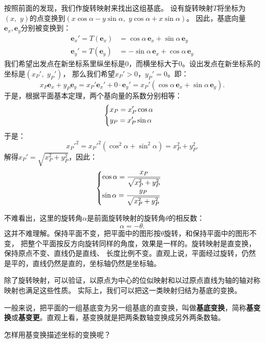 \documentclass[12pt,UTF8,fontset=none]{ctexbook}
\begin{document}
按照前面的发现，我们作旋转映射来找出这组基底。
设有旋转映射$T$将坐标为$(x,\,\, y)$的点变换到$(x\cos{\alpha} - y\sin{\alpha},\,\,y\cos{\alpha} + x\sin{\alpha})$。
因此，基底向量$\mathbf{e}_x, \mathbf{e}_y$分别被变换到：
\begin{align*}
    \mathbf{e}_x' = T(\mathbf{e}_x) &= \cos{\alpha}\,\mathbf{e}_x + \sin{\alpha}\,\mathbf{e}_y  \\
    \mathbf{e}_y' = T(\mathbf{e}_y) &= -\sin{\alpha}\,\mathbf{e}_x + \cos{\alpha}\,\mathbf{e}_y  
\end{align*}
我们希望出发点在新坐标系里纵坐标是$0$，而横坐标大于$0$。设出发点在新坐标系的坐标是$(x_P', \,\, y_P')$，
那么我们希望$x_P' > 0$，$y_P' = 0$。即：
$$ x_P\mathbf{e}_x + y_P\mathbf{e}_y = x_P' \mathbf{e}_x' + 0 \cdot \mathbf{e}_y' = x_P' (\cos{\alpha}\,\mathbf{e}_x + \sin{\alpha}\,\mathbf{e}_y). $$
于是，根据平面基本定理，两个基向量的系数分别相等：
\begin{alignat*}{1}
&   \begin{dcases}
        x_P = x_P' \cos{\alpha} \\
        y_P = x_P' \sin{\alpha} 
    \end{dcases}
\end{alignat*}
于是：
$$ x_P'^2 = x_P'^2 (\cos^2{\alpha} + \sin^2{\alpha}) = x_P^2 + y_P^2. $$
解得$x_P' = \sqrt{x_P^2 + y_P^2}$，因此：
\begin{alignat*}{1}
&   \begin{dcases}
        \cos{\alpha} = \frac{x_P}{\sqrt{x_P^2 + y_P^2}} \\
        \sin{\alpha} = \frac{y_P}{\sqrt{x_P^2 + y_P^2}} 
    \end{dcases}
\end{alignat*}

不难看出，这里的旋转角$\alpha$是前面旋转映射的旋转角$\theta$的相反数：
$$ \alpha = -\theta.$$
这并不难理解。保持平面不变，把平面中的图形按$\theta$旋转，和保持平面中的图形不变，
把整个平面按反方向旋转同样的角度，效果是一样的。旋转映射是直变换，保持原点不变、直线仍是直线、
长度比例不变。直观上说，平面经过旋转，仍然是平的，直线仍然是直的，坐标轴仍然是坐标轴。

除了旋转映射，可以验证，以原点为中心的位似映射和以过原点直线为轴的轴对称映射也满足这些性质。
实际上，我们可以把这一类映射归结为基底的变换。

一般来说，把平面的一组基底变为另一组基底的直变换，叫做\textbf{基底变换}，简称\textbf{基变换}或\textbf{基变更}。直观上看，基变换就是把两条数轴变换成另外两条数轴。

怎样用基变换描述坐标的变换呢？
\end{document}
